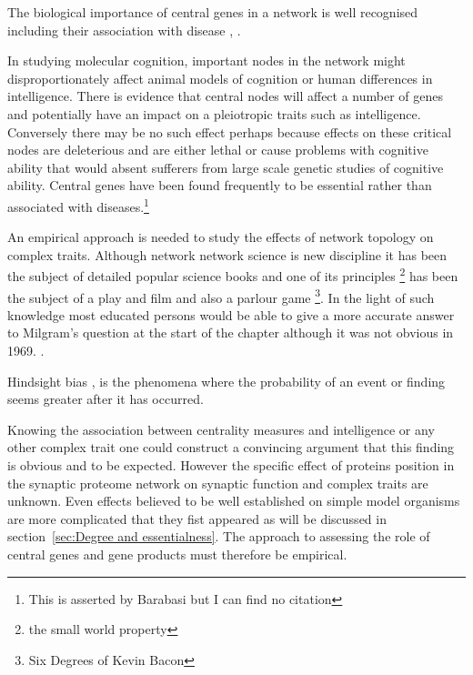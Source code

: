 The biological importance of central genes in a network is well recognised \cite{jeong2001lethality} including their association with disease \cite{vogelstein2000surfing}, \cite{albert2005scale} \cite{xu2006discovering}.
 
 In studying molecular cognition, important nodes in the network might disproportionately affect animal models of cognition or human differences in intelligence. There is evidence that central nodes will affect a number of genes and potentially have an impact on a pleiotropic traits \cite{chavali2010network} such as intelligence.\cite{plomin2015genetics} \cite{visscher2016plethora}   Conversely there may be no such effect perhaps because effects on these critical nodes are deleterious and are either lethal or cause problems with cognitive ability that would absent sufferers from large scale genetic studies of cognitive ability. Central genes have been found frequently to be essential rather than associated with diseases.\cite{barabasi2011network}\footnote{This is asserted by Barabasi but I can find no citation}
 
 An empirical approach is needed to study the effects of network topology on complex traits. Although network network science is new discipline it has been the subject of detailed popular science books \cite{barabasi2002linked} and one of its principles \footnote{the small world property} has been the subject of a play \cite{guare1990six} and film and also a parlour game \footnote{Six Degrees of Kevin Bacon}.\cite{collins1998s} In the light of such knowledge most educated persons would be able to give a more accurate answer to Milgram's question at the start of the chapter although it was not obvious in 1969. . 

 
 
 Hindsight bias \cite{fischhoff1975hindsight} \cite{fischhoff2007early}, is the phenomena where the probability of an event or finding seems greater after it has occurred.
 
Knowing the association between centrality measures and intelligence or any other complex trait one could construct a convincing argument that this finding is obvious and to be expected. However the specific effect of proteins position in the synaptic proteome network on synaptic function and complex traits are unknown. Even effects believed to be well established on simple model organisms are more complicated that they fist appeared as will be discussed in section~\ref{sec:Degree and essentialness}. The approach to assessing the role of central genes and gene products must therefore be empirical. 
 
